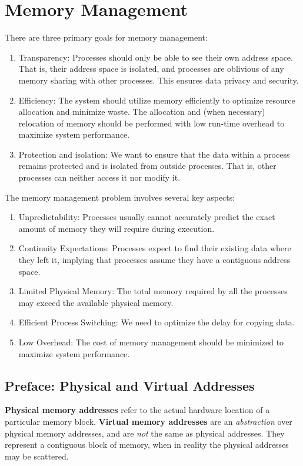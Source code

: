 \documentclass{report}
\newcommand{\definitionBegin}[1]{\begin{tcolorbox}[title={Definition: #1}]}
\newcommand{\definitionEnd}{\end{tcolorbox}}
\begin{document}
\chapter{Memory Management}
\label{chap:MM}
There are three primary goals for memory management:
\begin{enumerate}[label=\textit{(\roman*)}]
\item Transparency: Processes should only be able to see their own address space. That is, their
  address space is isolated, and processes are oblivious of any memory sharing with other
  processes. This ensures data privacy and security.
\item Efficiency: The system should utilize memory efficiently to optimize resource allocation and
  minimize waste. The allocation and (when necessary) relocation of memory should be performed with
  low run-time overhead to maximize system performance.
\item Protection and isolation: We want to ensure that the data within a process remains protected
  and is isolated from outside processes. That is, other processes can neither access it nor modify
  it.
\end{enumerate}
The memory management problem involves several key aspects:
\begin{enumerate}[label=\textit{(\roman*)}]
\item Unpredictability: Processes usually cannot accurately predict the exact amount of memory they
  will require during execution.
\item Continuity Expectations: Processes expect to find their existing data where they left it,
  implying that processes assume they have a contiguous address space.
\item Limited Physical Memory: The total memory required by all the processes may exceed the
  available physical memory.
\item Efficient Process Switching: We need to optimize the delay for copying data.
\item Low Overhead: The cost of memory management should be minimized to maximize system performance.
\end{enumerate}





\section*{Preface: Physical and Virtual Addresses}
\definitionBegin{Physical and Virtual Memory Addresses}
\textbf{Physical memory addresses} refer to the actual hardware location of a particular memory
block.
\tcblower
\textbf{Virtual memory addresses} are an \textit{abstraction} over physical memory addresses, and
are \textit{not} the same as physical addresses. They represent a contiguous block of memory, when
in reality the physical addresses may be scattered.
\definitionEnd
\end{document}
